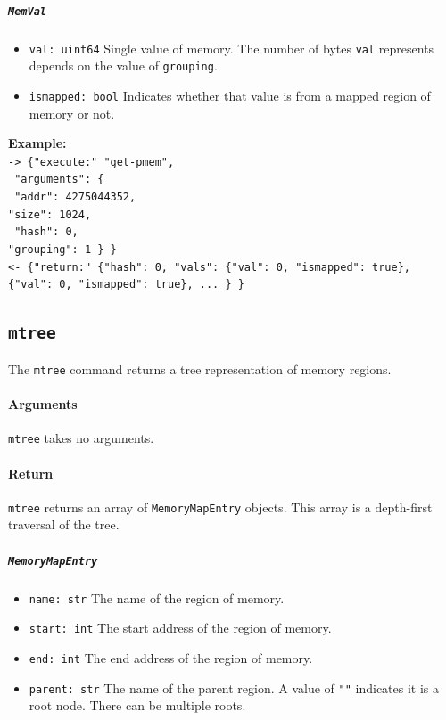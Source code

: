 \documentclass{article}
\newcommand{\code}[1]{\texttt{#1}}
\begin{document}
    \subparagraph{\code{MemVal}}
    \begin{itemize}
        \item \code{val: uint64}
            \subitem Single value of memory. The number of bytes \code{val} represents depends on the value of \code{grouping}.
        \item \code{ismapped: bool}
            \subitem Indicates whether that value is from a mapped region of memory or not.
    \end{itemize}
\textbf{Example:} \\
\code{-> \{"execute:" "get-pmem",} \\
\code{        "arguments": \{}\\
\code{            "addr": 4275044352,}\\
\code{"size": 1024,}\\
\code{      "hash": 0,}\\
\code{"grouping": 1 \} \}}   \\
\code{<- \{"return:" \{"hash": 0, "vals": \{"val": 0, "ismapped": true\}, \{"val": 0, "ismapped": true\}, ... \} \}}

\subsection{\code{mtree}}
The \code{mtree} command returns a tree representation of memory regions. 

\paragraph{Arguments} \code{mtree} takes no arguments.

\paragraph{Return} \code{mtree} returns an array of \code{MemoryMapEntry} objects. This array is a depth-first traversal of the tree.
\subparagraph{\code{MemoryMapEntry}}
\begin{itemize}
    \item \code{name: str}
        \subitem The name of the region of memory.
    \item \code{start: int}
        \subitem The start address of the region of memory.
    \item \code{end: int}
        \subitem The end address of the region of memory.
    \item \code{parent: str}
        \subitem The name of the parent region. A value of \code{""} indicates it is a root node. There can be multiple roots.
\end{itemize}
\end{document}
